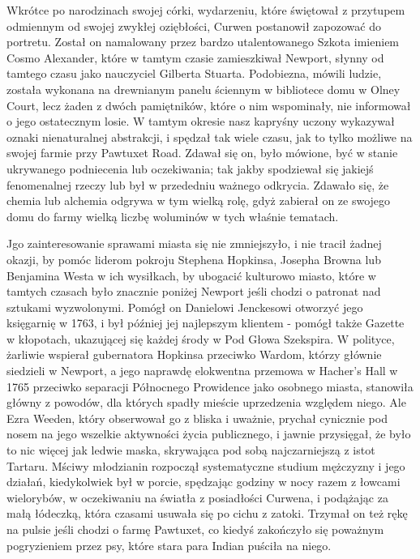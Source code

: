 Wkrótce po narodzinach swojej córki, wydarzeniu, które świętował z przytupem odmiennym od swojej zwykłej oziębłości, Curwen postanowił zapozować do portretu. Został on namalowany przez bardzo utalentowanego Szkota imieniem Cosmo Alexander, które w tamtym czasie zamieszkiwał Newport, słynny od tamtego czasu jako nauczyciel Gilberta Stuarta. Podobiezna, mówili ludzie, została wykonana na drewnianym panelu ściennym w bibliotece domu w Olney Court, lecz żaden z dwóch pamiętników, które o nim wspominały, nie informował o jego ostatecznym losie. W tamtym okresie nasz kapryśny uczony wykazywał oznaki nienaturalnej abstrakcji, i spędzał tak wiele czasu, jak to tylko możliwe na swojej farmie przy Pawtuxet Road. Zdawał się on, było mówione, być w stanie ukrywanego podniecenia lub oczekiwania; tak jakby spodziewał się jakiejś fenomenalnej rzeczy lub był w przededniu ważnego odkrycia. Zdawało się, że chemia lub alchemia odgrywa w tym wielką rolę, gdyż zabierał on ze swojego domu do farmy wielką liczbę woluminów w tych właśnie tematach.

Jgo zainteresowanie sprawami miasta się nie zmniejszyło, i nie tracił żadnej okazji, by pomóc liderom pokroju Stephena Hopkinsa, Josepha Browna lub Benjamina Westa w ich wysiłkach, by ubogacić kulturowo miasto, które w tamtych czasach było znacznie poniżej Newport jeśli chodzi o patronat nad sztukami wyzwolonymi. Pomógł on Danielowi Jenckesowi otworzyć jego księgarnię w 1763, i był później jej najlepszym klientem - pomógł także Gazette w kłopotach, ukazującej się każdej środy w Pod Głowa Szekspira. W polityce, żarliwie wspierał gubernatora Hopkinsa przeciwko Wardom, którzy głównie siedzieli w Newport, a jego naprawdę elokwentna przemowa w Hacher's Hall w 1765 przeciwko separacji Północnego Prowidence jako osobnego miasta, stanowiła główny z powodów, dla których spadły  mieście uprzedzenia względem niego. Ale Ezra Weeden, który obserwował go z bliska i uważnie, prychał cynicznie pod nosem na jego wszelkie aktywności życia publicznego, i jawnie przysięgał, że było to nic więcej jak ledwie maska, skrywająca pod sobą najczarniejszą z istot Tartaru. Mściwy młodzianin rozpoczął systematyczne studium mężczyzny i jego działań, kiedykolwiek był w porcie, spędzając godziny w nocy razem z łowcami wielorybów, w oczekiwaniu na światła z posiadłości Curwena, i podążając za małą łódeczką, która czasami usuwała się po cichu z zatoki. Trzymał on też rękę na pulsie jeśli chodzi o farmę Pawtuxet, co kiedyś zakończyło się poważnym pogryzieniem przez psy, które stara para Indian puściła na niego. 

